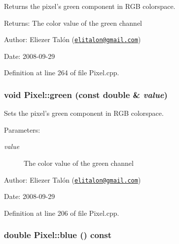 Returns the pixel's green component in RGB colorspace. 

\begin{Desc}
\item[Returns:]The color value of the green channel\end{Desc}
\begin{Desc}
\item[Author:]Eliezer Talón (\href{mailto:elitalon@gmail.com}{\tt elitalon@gmail.com}) \end{Desc}
\begin{Desc}
\item[Date:]2008-09-29 \end{Desc}


Definition at line 264 of file Pixel.cpp.\hypertarget{class_pixel_1b2f2bd7aec76a37e1c9c0d8bdbba3ba}{
\subsubsection[green]{\setlength{\rightskip}{0pt plus 5cm}void Pixel::green (const double \& {\em value})}}
\label{class_pixel_1b2f2bd7aec76a37e1c9c0d8bdbba3ba}


Sets the pixel's green component in RGB colorspace. 

\begin{Desc}
\item[Parameters:]
\begin{description}
\item[{\em value}]The color value of the green channel\end{description}
\end{Desc}
\begin{Desc}
\item[Author:]Eliezer Talón (\href{mailto:elitalon@gmail.com}{\tt elitalon@gmail.com}) \end{Desc}
\begin{Desc}
\item[Date:]2008-09-29 \end{Desc}


Definition at line 206 of file Pixel.cpp.\hypertarget{class_pixel_978b4078a48ff2a67b55dd10eec78fb2}{
\subsubsection[blue]{\setlength{\rightskip}{0pt plus 5cm}double Pixel::blue () const}}
\label{class_pixel_978b4078a48ff2a67b55dd10eec78fb2}


